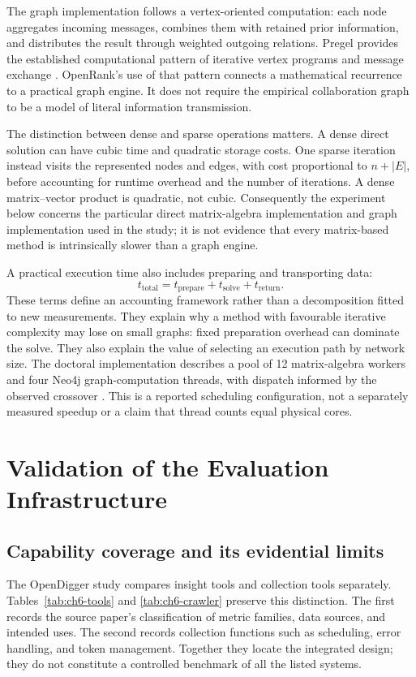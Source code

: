 The graph implementation follows a vertex-oriented computation: each node aggregates incoming messages, combines them with retained prior information, and distributes the result through weighted outgoing relations. Pregel provides the established computational pattern of iterative vertex programs and message exchange \citep{malewicz2010}. OpenRank's use of that pattern connects a mathematical recurrence to a practical graph engine. It does not require the empirical collaboration graph to be a model of literal information transmission.

The distinction between dense and sparse operations matters. A dense direct solution can have cubic time and quadratic storage costs. One sparse iteration instead visits the represented nodes and edges, with cost proportional to \(n+|E|\), before accounting for runtime overhead and the number of iterations. A dense matrix--vector product is quadratic, not cubic. Consequently the experiment below concerns the particular direct matrix-algebra implementation and graph implementation used in the study; it is not evidence that every matrix-based method is intrinsically slower than a graph engine.

A practical execution time also includes preparing and transporting data:
\begin{equation}
 t_{\mathrm{total}}
 =t_{\mathrm{prepare}}+t_{\mathrm{solve}}+t_{\mathrm{return}}.
 \label{eq:ch6-time}
\end{equation}
These terms define an accounting framework rather than a decomposition fitted to new measurements. They explain why a method with favourable iterative complexity may lose on small graphs: fixed preparation overhead can dominate the solve. They also explain the value of selecting an execution path by network size. The doctoral implementation describes a pool of 12 matrix-algebra workers and four Neo4j graph-computation threads, with dispatch informed by the observed crossover \citep[Section 4.3.2]{zhao2025thesis}. This is a reported scheduling configuration, not a separately measured speedup or a claim that thread counts equal physical cores.

\section{Validation of the Evaluation Infrastructure}
\label{sec:ch6-validation}

\subsection{Capability coverage and its evidential limits}
The OpenDigger study compares insight tools and collection tools separately. Tables~\ref{tab:ch6-tools} and \ref{tab:ch6-crawler} preserve this distinction. The first records the source paper's classification of metric families, data sources, and intended uses. The second records collection functions such as scheduling, error handling, and token management. Together they locate the integrated design; they do not constitute a controlled benchmark of all the listed systems.

